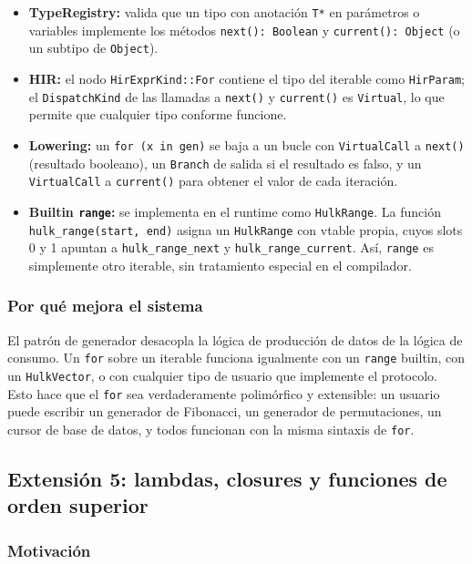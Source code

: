 \documentclass[12pt,letterpaper]{article}
\newcommand{\src}[1]{\texttt{#1}}
\begin{document}
\begin{itemize}
    \item \textbf{TypeRegistry:} valida que un tipo con anotación \src{T*} en parámetros o variables implemente los métodos \src{next(): Boolean} y \src{current(): Object} (o un subtipo de \src{Object}).
    \item \textbf{HIR:} el nodo \src{HirExprKind::For} contiene el tipo del iterable como \src{HirParam}; el \src{DispatchKind} de las llamadas a \src{next()} y \src{current()} es \src{Virtual}, lo que permite que cualquier tipo conforme funcione.
    \item \textbf{Lowering:} un \src{for (x in gen)} se baja a un bucle con \src{VirtualCall} a \src{next()} (resultado booleano), un \src{Branch} de salida si el resultado es falso, y un \src{VirtualCall} a \src{current()} para obtener el valor de cada iteración.
    \item \textbf{Builtin \src{range}:} se implementa en el runtime como \src{HulkRange}. La función \src{hulk\_range(start, end)} asigna un \src{HulkRange} con vtable propia, cuyos slots 0 y 1 apuntan a \src{hulk\_range\_next} y \src{hulk\_range\_current}. Así, \src{range} es simplemente otro iterable, sin tratamiento especial en el compilador.
\end{itemize}

\subsubsection{Por qué mejora el sistema}

El patrón de generador desacopla la lógica de producción de datos de la lógica de consumo. Un \src{for} sobre un iterable funciona igualmente con un \src{range} builtin, con un \src{HulkVector}, o con cualquier tipo de usuario que implemente el protocolo. Esto hace que el \src{for} sea verdaderamente polimórfico y extensible: un usuario puede escribir un generador de Fibonacci, un generador de permutaciones, un cursor de base de datos, y todos funcionan con la misma sintaxis de \src{for}.

\subsection{Extensión 5: lambdas, closures y funciones de orden superior}

\subsubsection{Motivación}
\end{document}
